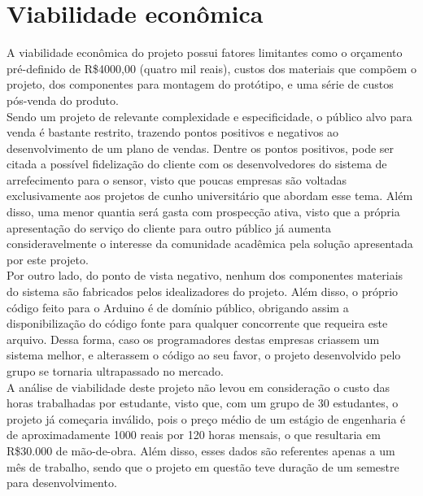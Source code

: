 
\chapter{Viabilidade econômica}
A viabilidade econômica do projeto possui fatores limitantes como o orçamento pré-definido de R\$4000,00 (quatro mil reais), custos dos materiais que compõem o projeto, dos componentes para montagem do protótipo, e uma série de custos pós-venda do produto. \\

Sendo um projeto de relevante complexidade e especificidade, o público alvo para venda é bastante restrito, trazendo pontos positivos e negativos ao desenvolvimento de um plano de vendas. Dentre os pontos positivos, pode ser citada a possível fidelização do cliente com os desenvolvedores do sistema de arrefecimento para o sensor, visto que poucas empresas são voltadas exclusivamente aos projetos de cunho universitário que abordam esse tema. Além disso, uma menor quantia será gasta com prospecção ativa, visto que a própria apresentação do serviço do cliente para outro público já aumenta consideravelmente o interesse da comunidade acadêmica pela solução apresentada por este projeto. \\

Por outro lado, do ponto de vista negativo, nenhum dos componentes materiais do sistema são fabricados pelos idealizadores do projeto. Além disso, o próprio código feito para o Arduino é de domínio público, obrigando assim a disponibilização do código fonte para qualquer concorrente que requeira este arquivo. Dessa forma, caso os programadores destas empresas criassem um sistema melhor, e alterassem o código ao seu favor, o projeto desenvolvido pelo grupo se tornaria ultrapassado no mercado.\\ 

A análise de viabilidade deste projeto não levou em consideração o custo das horas trabalhadas por estudante, visto que, com um grupo de 30 estudantes, o projeto já começaria inválido, pois o preço médio de um estágio de engenharia é de aproximadamente 1000 reais por 120 horas mensais, o que resultaria em R\$30.000 de mão-de-obra. Além disso, esses dados são referentes apenas a um mês de trabalho, sendo que o projeto em questão teve duração de um semestre para desenvolvimento. \\

